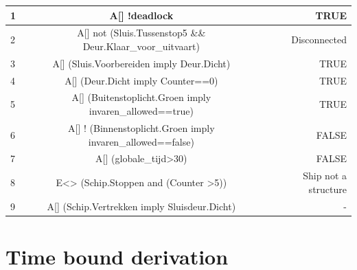 \begin{center}
	\begin{tabular}{| l | c || r | }
		\hline
		1 &A[] !deadlock  &  TRUE \\ \hline
		2 & A[] not (Sluis.Tussenstop5 \&\& Deur.Klaar\_voor\_uitvaart)  &  Disconnected \\ \hline
		3 & A[]  (Sluis.Voorbereiden imply Deur.Dicht)   &  TRUE\\   \hline
		4 &A[]  (Deur.Dicht imply Counter==0)   & TRUE  \\   \hline
		5 & A[]  (Buitenstoplicht.Groen imply invaren\_allowed==true)  &  TRUE \\ \hline
		6 & A[] ! (Binnenstoplicht.Groen imply invaren\_allowed==false)  & FALSE \\ \hline
		7 & A[]  (globale\_tijd>30)   &  FALSE\\    \hline
		8 & E<>  (Schip.Stoppen and (Counter >5))   & Ship not a structure  \\   \hline
		9 & A[] (Schip.Vertrekken imply Sluisdeur.Dicht)  &  -  \\   \hline
		\hline
	\end{tabular}
\end{center}


 
%
%
%






\chapter{Time bound derivation}

